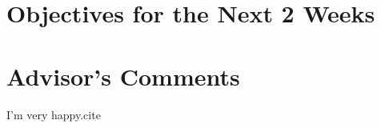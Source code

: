 \documentclass[11pt]{report}
\begin{document}
	
	
	\section{Objectives for the Next 2 Weeks}
	
	
	\section{Advisor's Comments}
	

	I'm very happy.cite \cite{IEEEexample:IEEEwebsite}
	
	
	
	
\end{document}

